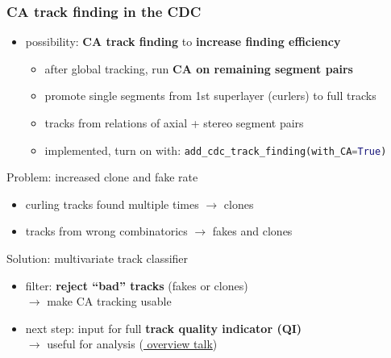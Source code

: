 \documentclass[18pt, aspectratio=169]{beamer}
\newcommand{\greenbold}[1]{\textcolor{kit-green100}{\bf{#1}}}
\newcommand{\orangebold}[1]{\textcolor{kit-orange100}{\bf{#1}}}
\begin{document}
\begin{frame}
  \frametitle{CA track finding in the CDC}
  \begin{itemize}
  \item possibility: \greenbold{CA track finding} to \orangebold{increase finding efficiency}
    \begin{itemize}
    \item after global tracking, run \greenbold{CA on remaining segment pairs}
    \item promote single segments from 1st superlayer (curlers) to full tracks
    \item tracks from relations of axial + stereo segment pairs
    \item implemented, turn on with: \lstinline[language=python, frame=single]{add_cdc_track_finding(with_CA=True)}            
    \end{itemize}
    
  \end{itemize}
  \pause
  \begin{alertblock}{Problem: increased clone and fake rate}
    \begin{itemize}
    \item curling tracks found multiple times $\rightarrow$ clones
    \item tracks from wrong combinatorics $\rightarrow$ fakes and clones
    \end{itemize}
  \end{alertblock}

  \begin{block}{Solution: multivariate track classifier}
    \begin{itemize}
    \item filter: \textbf{reject ``bad'' tracks} (fakes or clones)\\
      $\rightarrow$ make CA tracking usable
    \item next step: input for full \textbf{track quality indicator (QI)}\\
      $\rightarrow$ useful for analysis
      (\href{https://kds.kek.jp/indico/event/26522/session/10/contribution/75/material/slides/0.pdf}{
        overview talk})
    \end{itemize}
  \end{block}
\end{frame}
\end{document}
